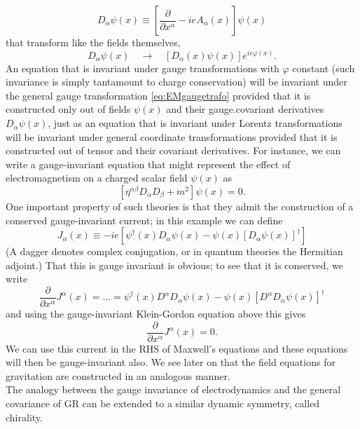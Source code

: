 \begin{equation}
	D_\alpha \psi(x) \equiv \left[\frac{\partial}{\partial x^\alpha} - i e A_\alpha(x)\right]\psi(x)
\end{equation}
that transform like the fields themselves,
\begin{equation}
	D_\alpha \psi(x) \quad \rightarrow \quad [D_\alpha(x) \psi(x)]e^{i e \varphi (x)}.
\end{equation}
An equation that is invariant under gauge transformations with $\varphi$ constant (such invariance is simply tantamount to charge conservation) will be invariant under the general gauge transformation \ref{eq:EMgaugetrafo} provided that it is constructed only out of fields $\psi(x)$ and their gauge.covariant derivatives $D_\alpha \psi(x)$, just as an equation that is invariant under Lorentz transformations will be invariant under general coordinate transformations provided that it is constructed out of tensor and their covariant derivatives. For instance, we can write a gauge-invariant equation that might represent the effect of electromagnetism on a charged scalar field $\psi(x)$ as
\begin{equation}
	\left[\eta^{\alpha \beta} D_\alpha D_\beta + m^2\right] \psi(x) = 0.
\end{equation}
One important property of such theories is that they admit the construction of a conserved gauge-invariant current; in this example we can define
\begin{equation}
	J_\alpha(x) \equiv -i e\left[\psi^\dagger (x) D_\alpha\psi(x) - \psi(x) [D_\alpha\psi(x)]^\dagger\right]
\end{equation}
(A dagger denotes complex conjugation, or in quantum theories the Hermitian adjoint.) That this is gauge invariant is obvious; to see that it is conserved, we write
\begin{equation}
\frac{\partial}{\partial x^\alpha} J^\alpha(x) = \dots = \psi^\dagger(x) D^\alpha D_\alpha\psi(x) - \psi(x) [D^\alpha D_\alpha\psi(x)]^\dagger
\end{equation}
and using the gauge-invariant Klein-Gordon equation above this gives
\begin{equation}
	\frac{\partial}{\partial x^\alpha} J^\alpha(x) =0.
\end{equation}
We can use this current in the RHS of Maxwell's equations and these equations will then be gauge-invariant also. We see later on that the field equations for gravitation are constructed in an analogous manner.\\
The analogy between the gauge invariance of electrodynamics and the general covariance of GR can be extended to a similar dynamic symmetry, called chirality.

















